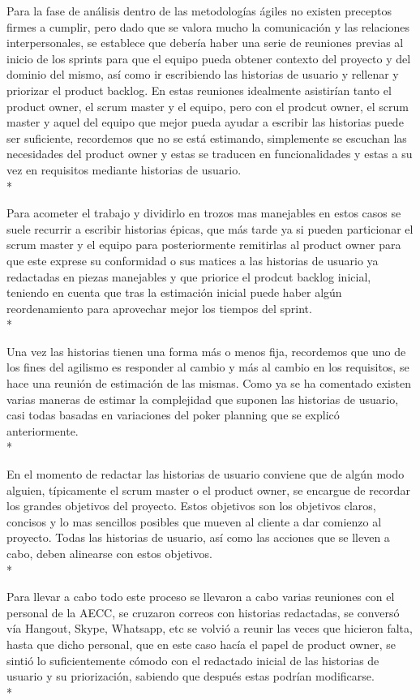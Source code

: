 \documentclass[../pfc.tex]{subfiles}
\begin{document}
	
Para la fase de análisis dentro de las metodologías ágiles no existen preceptos firmes a cumplir, pero dado que se valora mucho la comunicación y las relaciones interpersonales, se establece que debería haber una serie de reuniones previas al inicio de los sprints para que el equipo pueda obtener contexto del proyecto y del dominio del mismo, así como ir escribiendo las historias de usuario y rellenar y priorizar el product backlog. En estas reuniones idealmente asistirían tanto el product owner, el scrum master y el equipo, pero con el prodcut owner, el scrum master y aquel del equipo que mejor pueda ayudar a escribir las historias puede ser suficiente, recordemos que no se está estimando, simplemente se escuchan las necesidades del product owner y estas se traducen en funcionalidades y estas a su vez en requisitos mediante historias de usuario.\\*

Para acometer el trabajo y dividirlo en trozos mas manejables en estos casos se suele recurrir a escribir historias épicas, que más tarde ya si pueden particionar el scrum master y el equipo para posteriormente remitirlas al product owner para que este exprese su conformidad o sus matices a las historias de usuario ya redactadas en piezas manejables y que priorice el prodcut backlog inicial, teniendo en cuenta que tras la estimación inicial puede haber algún reordenamiento para aprovechar mejor los tiempos del sprint.\\* 

Una vez las historias tienen una forma más o menos fija, recordemos que uno de los fines del agilismo es responder al cambio y más al cambio en los requisitos, se hace una reunión de estimación de las mismas. Como ya se ha comentado existen varias maneras de estimar la complejidad que suponen las historias de usuario, casi todas basadas en variaciones del poker planning que se explicó anteriormente.\\* 

En el momento de redactar las historias de usuario conviene que de algún modo alguien, típicamente el scrum master o el product owner, se encargue de recordar los grandes objetivos del proyecto. Estos objetivos son los objetivos claros, concisos y lo mas sencillos posibles que mueven al cliente a dar comienzo al proyecto. Todas las historias de usuario, así como las acciones que se lleven a cabo, deben alinearse con estos objetivos.\\*


Para llevar a cabo todo este proceso se llevaron a cabo varias reuniones con el personal de la AECC, se cruzaron correos con historias redactadas, se conversó vía Hangout, Skype, Whatsapp, etc se volvió a reunir las veces que hicieron falta, hasta que dicho personal, que en este caso hacía el papel de product owner,  se sintió lo suficientemente cómodo con el redactado inicial de las historias de usuario y su priorización, sabiendo que después estas podrían modificarse.\\*
	
\end{document}

